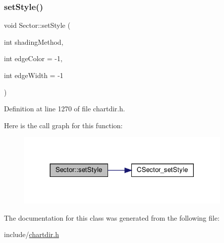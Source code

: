 \subsubsection{\texorpdfstring{set\+Style()}{setStyle()}}
{\footnotesize\ttfamily void Sector\+::set\+Style (\begin{DoxyParamCaption}\item[{int}]{shading\+Method,  }\item[{int}]{edge\+Color = {\ttfamily -\/1},  }\item[{int}]{edge\+Width = {\ttfamily -\/1} }\end{DoxyParamCaption})\hspace{0.3cm}{\ttfamily [inline]}}



Definition at line 1270 of file chartdir.\+h.

Here is the call graph for this function\+:
\nopagebreak
\begin{figure}[H]
\begin{center}
\leavevmode
\includegraphics[width=297pt]{class_sector_a77d33f22f2a3b3e526c848ce17ff82d6_cgraph}
\end{center}
\end{figure}


The documentation for this class was generated from the following file\+:\begin{DoxyCompactItemize}
\item 
include/\hyperlink{chartdir_8h}{chartdir.\+h}\end{DoxyCompactItemize}
